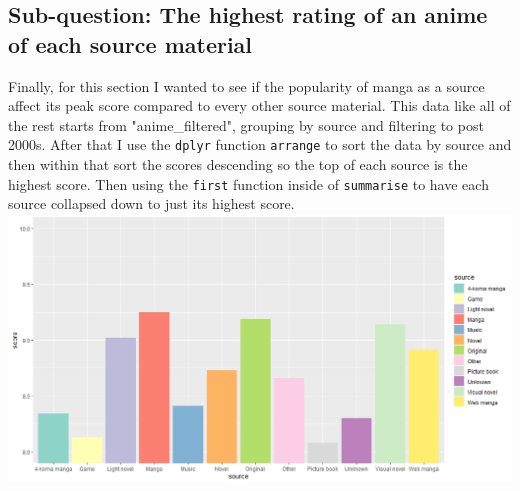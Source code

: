 \documentclass[a4paper]{article}
\begin{document}
	\subsection*{Sub-question: The highest rating of an anime of each source material}
	Finally, for this section I wanted to see if the popularity of manga as a source affect its peak score compared to every other source material. This data like all of the rest starts from "anime\_filtered", grouping by source and filtering to post 2000s. After that I use the \texttt{dplyr} function \texttt{arrange} to sort the data by source and then within that sort the scores descending so the top of each source is the highest score. Then using the \texttt{first} function inside of \texttt{summarise} to have each source collapsed down to just its highest score.\\
	\noindent\includegraphics[scale=0.60]{HighestRatingBySource.png}
	
	\pagebreak
	
\end{document}
